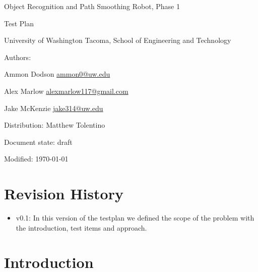 \documentclass[english,12pt]{article}
\begin{document}
\begin{center}

\thispagestyle{empty}

$ $

\vspace{250pt}

\begin{bfseries}

{\Large Object Recognition and Path Smoothing Robot, Phase 1}

{\Huge Test Plan}


\end{bfseries}

\vspace{180pt}

University of Washington Tacoma, School of Engineering and Technology


\vspace{12pt}

Authors: 

Ammon Dodson \href{mailto:ammon0@uw.edu}{ammon0@uw.edu} 

Alex Marlow \href{mailto:alexmarlow117@gmail.com}{alexmarlow117@gmail.com} 

Jake McKenzie \href{mailto:jake314@uw.edu}{jake314@uw.edu}

Distribution: Matthew Tolentino

Document state: draft

Modified: \today

\end{center}

\newpage


\tableofcontents

\newpage


\section{Revision History}

\begin{itemize}
	\item v0.1: In this version of the testplan we defined the  
    scope of the problem with the introduction, test items and 
    approach. 
\end{itemize}


\section{Introduction}
\end{document}
